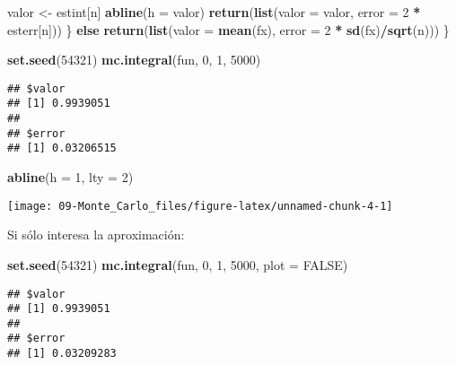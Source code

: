 \documentclass[
]{book}
\newenvironment{Shaded}{\begin{snugshade}}{\end{snugshade}}
\newcommand{\ControlFlowTok}[1]{\textcolor[rgb]{0.13,0.29,0.53}{\textbf{#1}}}
\newcommand{\DataTypeTok}[1]{\textcolor[rgb]{0.13,0.29,0.53}{#1}}
\newcommand{\DecValTok}[1]{\textcolor[rgb]{0.00,0.00,0.81}{#1}}
\newcommand{\KeywordTok}[1]{\textcolor[rgb]{0.13,0.29,0.53}{\textbf{#1}}}
\newcommand{\NormalTok}[1]{#1}
\newcommand{\OperatorTok}[1]{\textcolor[rgb]{0.81,0.36,0.00}{\textbf{#1}}}
\newcommand{\OtherTok}[1]{\textcolor[rgb]{0.56,0.35,0.01}{#1}}
\newcommand{\StringTok}[1]{\textcolor[rgb]{0.31,0.60,0.02}{#1}}
\theoremstyle{break}
\theoremstyle{definition}
\theoremstyle{definition}
\theoremstyle{definition}
\theoremstyle{remark}
\begin{document}
\begin{Shaded}
\begin{Highlighting}[]
\NormalTok{      valor <-}\StringTok{ }\NormalTok{estint[n]}
      \KeywordTok{abline}\NormalTok{(}\DataTypeTok{h =}\NormalTok{ valor)}
      \KeywordTok{return}\NormalTok{(}\KeywordTok{list}\NormalTok{(}\DataTypeTok{valor =}\NormalTok{ valor, }\DataTypeTok{error =} \DecValTok{2} \OperatorTok{*}\StringTok{ }\NormalTok{esterr[n]))}
\NormalTok{    \} }\ControlFlowTok{else} \KeywordTok{return}\NormalTok{(}\KeywordTok{list}\NormalTok{(}\DataTypeTok{valor =} \KeywordTok{mean}\NormalTok{(fx), }\DataTypeTok{error =} \DecValTok{2} \OperatorTok{*}\StringTok{ }\KeywordTok{sd}\NormalTok{(fx)}\OperatorTok{/}\KeywordTok{sqrt}\NormalTok{(n)))}
\NormalTok{  \}}

\KeywordTok{set.seed}\NormalTok{(}\DecValTok{54321}\NormalTok{)}
\KeywordTok{mc.integral}\NormalTok{(fun, }\DecValTok{0}\NormalTok{, }\DecValTok{1}\NormalTok{, }\DecValTok{5000}\NormalTok{)}
\end{Highlighting}
\end{Shaded}

\begin{verbatim}
## $valor
## [1] 0.9939051
## 
## $error
## [1] 0.03206515
\end{verbatim}

\begin{Shaded}
\begin{Highlighting}[]
\KeywordTok{abline}\NormalTok{(}\DataTypeTok{h =} \DecValTok{1}\NormalTok{, }\DataTypeTok{lty =} \DecValTok{2}\NormalTok{)}
\end{Highlighting}
\end{Shaded}

\begin{center}\texttt{[image: 09-Monte\_Carlo\_files/figure-latex/unnamed-chunk-4-1]} \end{center}

Si sólo interesa la aproximación:

\begin{Shaded}
\begin{Highlighting}[]
\KeywordTok{set.seed}\NormalTok{(}\DecValTok{54321}\NormalTok{)}
\KeywordTok{mc.integral}\NormalTok{(fun, }\DecValTok{0}\NormalTok{, }\DecValTok{1}\NormalTok{, }\DecValTok{5000}\NormalTok{, }\DataTypeTok{plot =} \OtherTok{FALSE}\NormalTok{)}
\end{Highlighting}
\end{Shaded}

\begin{verbatim}
## $valor
## [1] 0.9939051
## 
## $error
## [1] 0.03209283
\end{verbatim}
\end{document}
